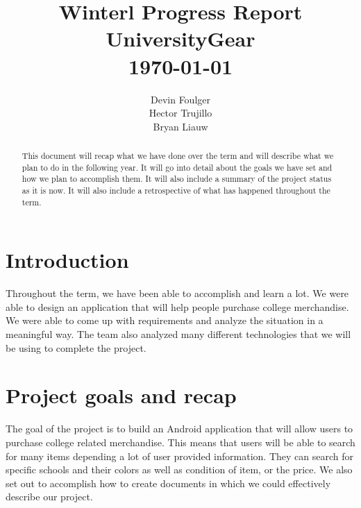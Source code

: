 \documentclass[journal,compsoc, 10pt, draftclsnofoot, onecolumn]{IEEEtran}
\begin{document}
\title{\vspace{20em}Winterl Progress Report \\{\vspace{-1ex}\huge UniversityGear} \\
{\large \today}}
\author{\vspace{10ex}Devin Foulger \\{\vspace{-1ex}Hector Trujillo}
\\{\vspace{-1ex}Bryan Liauw}}

\begin{titlepage}

\maketitle
\thispagestyle{empty}

\begin{abstract}
This document will recap what we have done over the term and will describe 
what we plan to do in the following year. It will go into detail about the goals 
we have set and how we plan to accomplish them. It will also include a summary 
of the project status as it is now. It will also include a retrospective of what 
has happened throughout the term.
\end{abstract}

\end{titlepage}

\tableofcontents

\section{Introduction}
Throughout the term, we have been able to accomplish and learn a lot. We were 
able to design an application that will help people purchase college merchandise. 
We were able to come up with requirements and analyze the situation in a 
meaningful way. The team also analyzed many different technologies that we 
will be using to complete the project. 

\section{Project goals and recap}
The goal of the project is to build an Android application that will allow users 
to purchase college related merchandise. This means that users will be able to 
search for many items depending a lot of user provided information. They can 
search for specific schools and their colors as well as condition of item, or 
the price. We also set out to accomplish how to create documents in which we 
could effectively describe our project. \newline
\end{document}
